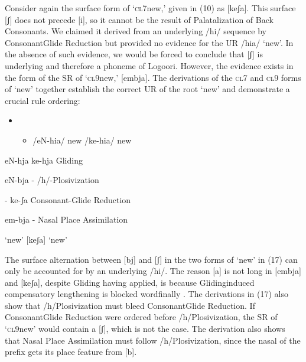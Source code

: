 Consider again the surface form of ‘\textsc{cl}7new,’ given in (10) as [keʃa]. This surface [ʃ] does not precede [i], so it cannot be the result of Palatalization of Back Consonants. We claimed it derived from an underlying /hi/ sequence by ConsonantGlide Reduction but provided no evidence for the UR /hia/ ‘new’. In the absence of such evidence, we would be forced to conclude that [ʃ] is underlying and therefore a phoneme of Logoori. However, the evidence exists in the form of the SR of ‘\textsc{cl}9new,’ [embja]. The derivations of the \textsc{cl}7 and \textsc{cl}9 forms of ‘new’ together establish the correct UR of the root ‘new’ and demonstrate a crucial rule ordering:

\begin{itemize}
\item \setcounter{itemize}{0}
\begin{itemize}
\item \begin{styleListParagraph}
/eN-hia/  new  /ke-hia/  new
\end{styleListParagraph}
\end{itemize}
\end{itemize}
\begin{styleListParagraph}
eN-hja      ke-hja        Gliding
\end{styleListParagraph}

\begin{styleListParagraph}
eN-bja      {}-        /h/-Plosivization
\end{styleListParagraph}

\begin{styleListParagraph}
{}-        ke-ʃa        Consonant-Glide Reduction
\end{styleListParagraph}

\begin{styleListParagraph}
em-bja      {}-        Nasal Place Assimilation
\end{styleListParagraph}

\begin{styleListParagraph}
[embja]  ‘new’    [keʃa]     ‘new’
\end{styleListParagraph}

The surface alternation between [bj] and [ʃ] in the two forms of ‘new’ in (17) can only be accounted for by an underlying /hi/. The reason [a] is not long in [embja] and [keʃa], despite Gliding having applied, is because Glidinginduced compensatory lengthening is blocked wordfinally \citep{Leung1991}. The derivations in (17) also show that /h/Plosivization must bleed ConsonantGlide Reduction. If ConsonantGlide Reduction were ordered before /h/Plosivization, the SR of ‘\textsc{cl}9new’ would contain a [ʃ], which is not the case. The derivation also shows that Nasal Place Assimilation must follow /h/Plosivization, since the nasal of the prefix gets its place feature from [b].

